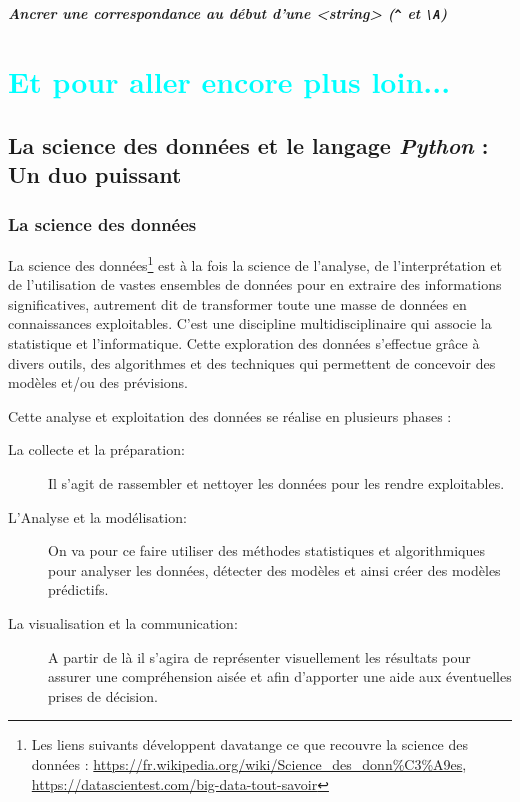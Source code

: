\documentclass[a4paper,12pt]{book}
\begin{document}
\subsubsection*{Ancrer une correspondance au début d'une <\textit{string}> (\texttt{\^} et \texttt{\textbackslash{}A})}

\part{\textcolor{cyan}{Et pour aller encore plus loin...}}
\chapter{La science des données et le langage \textit{Python} : Un duo puissant}
\section{La science des données}
La science des données\footnote{Les liens suivants développent davatange ce que recouvre la science des données : \url{https://fr.wikipedia.org/wiki/Science_des_donn\%C3\%A9es}, \url{https://datascientest.com/big-data-tout-savoir}} est à la fois la science de l'analyse, de l'interprétation et de l'utilisation de vastes ensembles de données pour en extraire 
des informations significatives, autrement dit de transformer toute une masse de données en connaissances exploitables. C'est une discipline 
multidisciplinaire qui associe la statistique et l'informatique. Cette exploration des données s'effectue grâce à divers outils, des algorithmes et des 
techniques qui permettent de concevoir des modèles et/ou des prévisions. 
\medskip

Cette analyse et exploitation des données se réalise en plusieurs phases :
\begin{description}
	\item[La collecte et la préparation:] Il s'agit de rassembler et nettoyer les données pour les rendre exploitables.
	\item[L'Analyse et la modélisation:] On va pour ce faire utiliser des méthodes statistiques et algorithmiques pour analyser les données, 
détecter des modèles et ainsi créer des modèles prédictifs.
	\item[La visualisation et la communication:] A partir de là il s'agira de représenter visuellement les résultats pour assurer une compréhension aisée 
et afin d'apporter une aide aux éventuelles prises de décision.
\end{description}
\medskip
\end{document}
